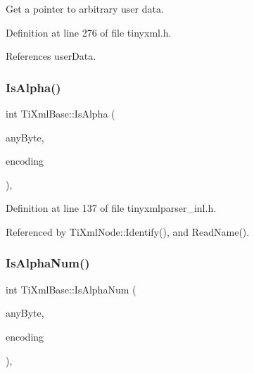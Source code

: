 Get a pointer to arbitrary user data. 



Definition at line 276 of file tinyxml.\+h.



References user\+Data.

\hypertarget{class_ti_xml_base_ae22522b2e8e1ac43102d16394f639fc8}{}\label{class_ti_xml_base_ae22522b2e8e1ac43102d16394f639fc8} 
\subsubsection{\texorpdfstring{Is\+Alpha()}{IsAlpha()}}
{\footnotesize\ttfamily int Ti\+Xml\+Base\+::\+Is\+Alpha (\begin{DoxyParamCaption}\item[{unsigned char}]{any\+Byte,  }\item[{\hyperlink{tinyxml_8h_a88d51847a13ee0f4b4d320d03d2c4d96}{Ti\+Xml\+Encoding}}]{encoding }\end{DoxyParamCaption})\hspace{0.3cm}{\ttfamily [static]}, {\ttfamily [protected]}}



Definition at line 137 of file tinyxmlparser\+\_\+inl.\+h.



Referenced by Ti\+Xml\+Node\+::\+Identify(), and Read\+Name().

\hypertarget{class_ti_xml_base_a321919055c115c78ded17f85a793f368}{}\label{class_ti_xml_base_a321919055c115c78ded17f85a793f368} 
\subsubsection{\texorpdfstring{Is\+Alpha\+Num()}{IsAlphaNum()}}
{\footnotesize\ttfamily int Ti\+Xml\+Base\+::\+Is\+Alpha\+Num (\begin{DoxyParamCaption}\item[{unsigned char}]{any\+Byte,  }\item[{\hyperlink{tinyxml_8h_a88d51847a13ee0f4b4d320d03d2c4d96}{Ti\+Xml\+Encoding}}]{encoding }\end{DoxyParamCaption})\hspace{0.3cm}{\ttfamily [static]}, {\ttfamily [protected]}}



